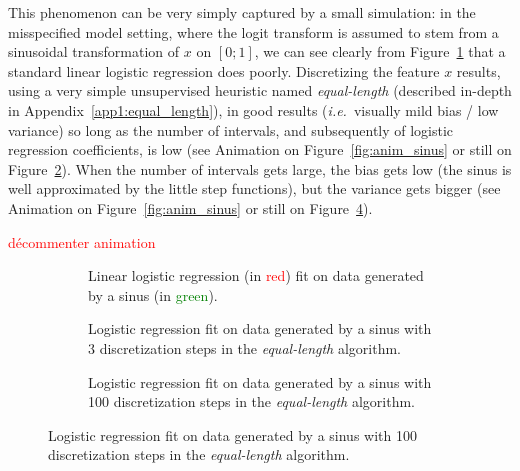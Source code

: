 This phenomenon can be very simply captured by a small simulation: in the misspecified model setting, where the logit transform is assumed to stem from a sinusoidal transformation of $x$ on $[0;1]$, we can see clearly from Figure~\ref{fig:sinus_lin} that a standard linear logistic regression does poorly. Discretizing the feature $x$ results, using a very simple unsupervised heuristic named \textit{equal-length} (described in-depth in Appendix~\ref{app1:equal_length}), in good results (\textit{i.e.}\ visually mild bias / low variance) so long as the number of intervals, and subsequently of logistic regression coefficients, is low (see Animation on Figure~\ref{fig:anim_sinus} or still on Figure~\ref{fig:sinus_deb}). When the number of intervals gets large, the bias gets low (the sinus is well approximated by the little step functions), but the variance gets bigger (see Animation on Figure~\ref{fig:anim_sinus} or still on Figure~\ref{fig:sinus_fin}).


\textcolor{red}{décommenter animation}


\begin{figure}[!h]
\vspace*{-1cm}
\begin{subfigure}[t]{\textwidth}
\resizebox{\textwidth}{7cm}{}
\vspace*{-1cm}
\caption{\label{fig:sinus_lin} Linear logistic regression (in \textcolor{red}{red}) fit on data generated by a sinus (in \textcolor{green}{green}).}
\end{subfigure}
\vspace*{-1cm}
\begin{subfigure}[t]{\textwidth}
\resizebox{\textwidth}{7cm}{}
\vspace*{-1cm}
\caption{\label{fig:sinus_deb} Logistic regression fit on data generated by a sinus with 3 discretization steps in the \textit{equal-length} algorithm.}
\end{subfigure}
\vspace*{-1cm}
\begin{subfigure}[t]{\textwidth}
\resizebox{\textwidth}{7cm}{}
\vspace*{-1cm}
\caption{\label{fig:sinus_fin} Logistic regression fit on data generated by a sinus with 100 discretization steps in the \textit{equal-length} algorithm.}
\end{subfigure}
\end{figure}
 
